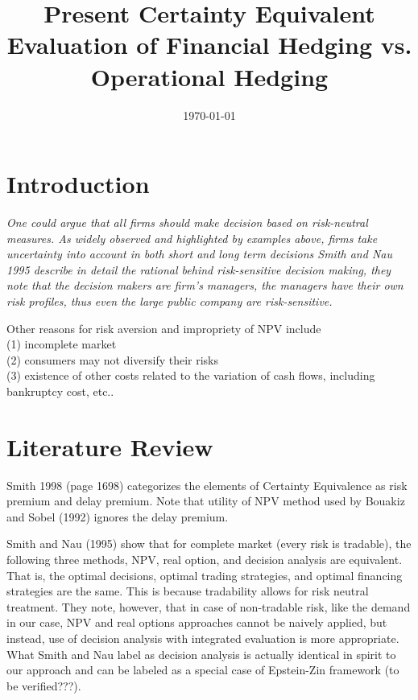 \documentclass{article}[12pt letter]
\date{\today}
\title{Present Certainty Equivalent Evaluation of Financial Hedging vs. Operational Hedging}
\begin{document}
\doublespacing

\maketitle
\bigskip





\section{Introduction}

\emph{ One could argue that all firms should make decision based on risk-neutral measures. As widely observed and highlighted by examples above, firms take uncertainty into account in both short and long term decisions Smith and Nau 1995 describe in detail the rational behind risk-sensitive decision making, they note that the decision makers are firm's managers, the managers have their own risk profiles, thus even the large public company are risk-sensitive.}

Other reasons for risk aversion and impropriety of NPV include \\
(1) incomplete market\\ 
(2) consumers may not diversify their risks\\
(3) existence of other costs related to the variation of cash flows, including bankruptcy cost, etc..


\section{Literature Review}

Smith 1998 (page 1698) categorizes  the elements of Certainty Equivalence as risk premium and delay premium. Note that utility of NPV method used by Bouakiz and Sobel (1992) ignores the delay premium.


Smith and Nau (1995) show that for complete market (every risk is tradable), the following three methods, NPV, real option, and decision analysis are equivalent. That is, the optimal decisions, optimal trading strategies, and optimal financing strategies are the same. This is because tradability allows for risk neutral treatment. They note, however, that in case of non-tradable risk, like the demand in our case,  NPV and real options approaches cannot be naively applied, but instead, use of decision analysis with integrated evaluation is more appropriate. What Smith and Nau label as decision analysis is actually identical in spirit to our approach and can be labeled as a special case of Epstein-Zin framework (to be verified???).
\end{document}
